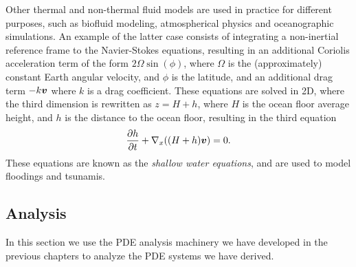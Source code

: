 \documentclass{article}
\renewcommand{\vec}{\vectorsym}
\newcommand{\vx}{\nabla_x}
\begin{document}
Other thermal and non-thermal fluid models are used in practice for different purposes, such as biofluid modeling, atmospherical physics and oceanographic simulations. An example of the latter case consists of integrating a non-inertial reference frame to the Navier-Stokes equations, resulting in an additional Coriolis acceleration term of the form $2\Omega \sin(\phi)$, where $\Omega$ is the (approximately) constant Earth angular velocity, and $\phi$ is the latitude, and an additional drag term $-k\vec v$ where $k$ is a drag coefficient. These equations are solved in 2D, where the third dimension is rewritten as $z = H+h$, where $H$ is the ocean floor average height, and $h$ is the distance to the ocean floor, resulting in the third equation
\begin{equation*}
    \frac{\partial h}{\partial t} + \vx((H+h)\vec v) = 0.
\end{equation*}
These equations are known as the \textit{shallow water equations}, and are used to model floodings and tsunamis.  

\subsection{Analysis}
In this section we use the PDE analysis machinery we have developed in the previous chapters to analyze the PDE systems we have derived. 
\end{document}
